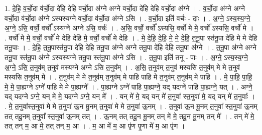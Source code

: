 \documentclass[17pt]{extarticle}
\begin{document}
1. दे॒हि॒ व॒र्चो॒दा व॑र्चो॒दा दे॑हि देहि वर्चो॒दा अ॑ग्ने अग्ने वर्चो॒दा दे॑हि देहि वर्चो॒दा अ॑ग्ने । . व॒र्चो॒दा अ॑ग्ने अग्ने वर्चो॒दा व॑र्चो॒दा अ॑ग्ने ऽस्यस्यग्ने वर्चो॒दा व॑र्चो॒दा अ॑ग्ने ऽसि । . व॒र्चो॒दा इति॑ वर्चः - दाः । . अ॒ग्ने॒ ऽस्य॒स्य॒ग्ने॒ अ॒ग्ने॒ ऽसि॒ वर्चो॒ वर्चो᳚ ऽस्यग्ने अग्ने ऽसि॒ वर्चः॑ । . अ॒सि॒ वर्चो॒ वर्चो᳚ ऽस्यसि॒ वर्चो॑ मे मे॒ वर्चो᳚ ऽस्यसि॒ वर्चो॑ मे । . वर्चो॑ मे मे॒ वर्चो॒ वर्चो॑ मे देहि देहि मे॒ वर्चो॒ वर्चो॑ मे देहि । . मे॒ दे॒हि॒ दे॒हि॒ मे॒ मे॒ दे॒हि॒ त॒नू॒पा स्त॑नू॒पा दे॑हि मे मे देहि तनू॒पाः । . दे॒हि॒ त॒नू॒पास्त॑नू॒पा दे॑हि देहि तनू॒पा अ॑ग्ने अग्ने तनू॒पा दे॑हि देहि तनू॒पा अ॑ग्ने । . त॒नू॒पा अ॑ग्ने अग्ने तनू॒पा स्त॑नू॒पा अ॑ग्ने ऽस्यस्यग्ने तनू॒पा स्त॑नू॒पा अ॑ग्ने ऽसि । . त॒नू॒पा इति॑ तनू - पाः । . अ॒ग्ने॒ ऽस्य॒स्य॒ग्ने॒ अ॒ग्ने॒ ऽसि॒ त॒नुव॑म् त॒नुव॑ मस्यग्ने अग्ने ऽसि त॒नुव᳚म् । . अ॒सि॒ त॒नुव॑म् त॒नुव॑ मस्यसि त॒नुव॑म् मे मे त॒नुव॑ मस्यसि त॒नुव॑म् मे । . त॒नुव॑म् मे मे त॒नुव॑म् त॒नुव॑म् मे पाहि पाहि मे त॒नुव॑म् त॒नुव॑म् मे पाहि । . मे॒ पा॒हि॒ पा॒हि॒ मे॒ मे॒ पा॒ह्यग्ने ऽग्ने॑ पाहि मे मे पा॒ह्यग्ने᳚ । . पा॒ह्यग्ने ऽग्ने॑ पाहि पा॒ह्यग्ने॒ यद् यदग्ने॑ पाहि पा॒ह्यग्ने॒ यत् । . अग्ने॒ यद् यदग्ने ऽग्ने॒ यन् मे॑ मे॒ यदग्ने ऽग्ने॒ यन् मे᳚ । . यन् मे॑ मे॒ यद् यन् मे॑ त॒नुवा᳚ स्त॒नुवा॑ मे॒ यद् यन् मे॑ त॒नुवाः᳚ । . मे॒ त॒नुवा᳚स्त॒नुवा॑ मे मे त॒नुवा॑ ऊ॒न मू॒नम् त॒नुवा॑ मे मे त॒नुवा॑ ऊ॒नम् । . त॒नुवा॑ ऊ॒न मू॒नम् त॒नुवा᳚ स्त॒नुवा॑ ऊ॒नम् तत् तदू॒नम् त॒नुवा᳚ स्त॒नुवा॑ ऊ॒नम् तत् । . ऊ॒नम् तत् तदू॒न मू॒नम् तन् मे॑ मे॒ तदू॒न मू॒नम् तन् मे᳚ । . तन् मे॑ मे॒ तत् तन् म॒ आ मे॒ तत् तन् म॒ आ । . म॒ आ मे॑ म॒ आ पृ॑ण पृ॒णा मे॑ म॒ आ पृ॑ण । \newline
\end{document}
